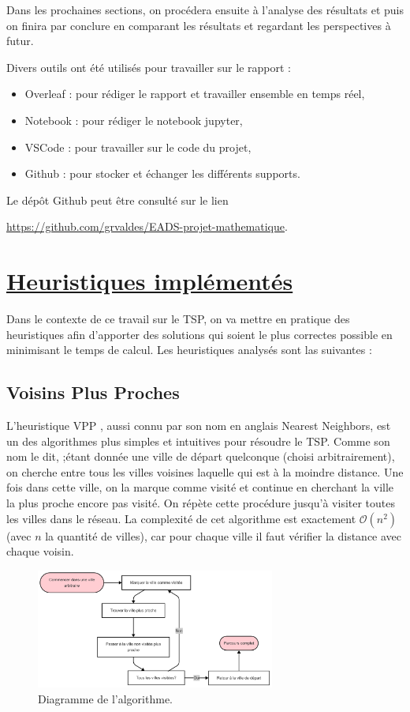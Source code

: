 \documentclass[a4paper,11pt,fleqn]{article}
\begin{document}
Dans les prochaines sections, on procédera ensuite à l’analyse des résultats et puis on finira par conclure en comparant les résultats et regardant les perspectives à futur.

Divers outils ont été utilisés pour travailler sur le rapport :
\begin{itemize}[noitemsep,topsep=5pt]
    \item Overleaf : pour rédiger le rapport et travailler ensemble en temps réel,
    \item Notebook : pour rédiger le notebook jupyter,
    \item VSCode : pour travailler sur le code du projet,
    \item Github : pour stocker et échanger les différents supports.
\end{itemize}

Le dépôt Github peut être consulté sur le lien 

\noindent \url{https://github.com/grvaldes/EADS-projet-mathematique}.

\section*{\underline{Heuristiques implémentés}}
Dans le contexte de ce travail sur le TSP,  on va mettre en pratique des heuristiques afin d’apporter des solutions qui soient le plus correctes possible en minimisant le temps de calcul.
Les heuristiques analysés sont las suivantes :
\subsection*{Voisins Plus Proches}
L'heuristique VPP \cite{article:nearest}, aussi connu par son nom en anglais Nearest Neighbors, est un des algorithmes plus simples et intuitives pour résoudre le TSP. Comme son nom le dit, ;étant donnée une ville de départ quelconque (choisi arbitrairement), on cherche entre tous les villes voisines laquelle qui est à la moindre distance. Une fois dans cette ville, on la marque comme visité et continue en cherchant la ville la plus proche encore pas visité. On répète cette procédure jusqu'à visiter toutes les villes dans le réseau. La complexité de cet algorithme est exactement $\mathcal{O}(n^2)$ (avec $n$ la quantité de villes), car pour chaque ville il faut vérifier la distance avec chaque voisin.

\begin{figure}[H]
    \centering
    \includegraphics[width=0.7\textwidth]{images/chart-nn.png}
    \caption{Diagramme de l'algorithme.}
    \label{fig:charte-nn}
\end{figure}
\end{document}
